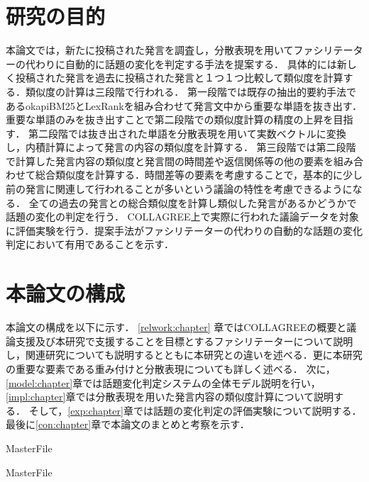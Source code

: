 \begin{comment}
分散表現を用いることで既存手法より人間の感覚に近しい処理を行うことができる．
以上のような背景を踏まえて，分散表現を用いてファシリテーターの代わりに話題の変化を判定し，知らせることを目指す．
話題転換の検出は発言同士の近さ，すなわち発言に含まれる単語意味の近さと見ることができる．
分散表現ではベクトル同士の内積計算を行うことで単語同士の意味の近さを計算することができる．
また，分散表現を使用することで機械翻訳を始めとする複数の分野で精度の向上が確認されている．
\end{comment}
\section{研究の目的}
\label{intro:taget}
本論文では，新たに投稿された発言を調査し，分散表現を用いてファシリテーターの代わりに自動的に話題の変化を判定する手法を提案する．
具体的には新しく投稿された発言を過去に投稿された発言と１つ１つ比較して類似度を計算する．類似度の計算は三段階で行われる．
第一段階では既存の抽出的要約手法であるokapiBM25とLexRankを組み合わせて発言文中から重要な単語を抜き出す．重要な単語のみを抜き出すことで第二段階での類似度計算の精度の上昇を目指す．
第二段階では抜き出された単語を分散表現を用いて実数ベクトルに変換し，内積計算によって発言の内容の類似度を計算する．
第三段階では第二段階で計算した発言内容の類似度と発言間の時間差や返信関係等の他の要素を組み合わせて総合類似度を計算する．時間差等の要素を考慮することで，基本的に少し前の発言に関連して行われることが多いという議論の特性を考慮できるようになる．
全ての過去の発言との総合類似度を計算し類似した発言があるかどうかで話題の変化の判定を行う．
COLLAGREE上で実際に行われた議論データを対象に評価実験を行う．提案手法がファシリテーターの代わりの自動的な話題の変化判定において有用であることを示す．

\section{本論文の構成}
本論文の構成を以下に示す．
\ref{relwork:chapter} 章ではCOLLAGREEの概要と議論支援及び本研究で支援することを目標とするファシリテーターについて説明し，関連研究についても説明するとともに本研究との違いを述べる．更に本研究の重要な要素である重み付けと分散表現についても詳しく述べる．
次に，\ref{model:chapter}章では話題変化判定システムの全体モデル説明を行い，\ref{impl:chapter}章では分散表現を用いた発言内容の類似度計算について説明する．
そして，\ref{exp:chapter}章では話題の変化判定の評価実験について説明する．
最後に\ref{con:chapter}章で本論文のまとめと考察を示す．

 \expandafter\ifx\csname MasterFile\endcsname\relax
	\def\BibFile{hoge}
	
  \fi
  \expandafter\ifx\csname MasterFile\endcsname\relax
  
  \fi

